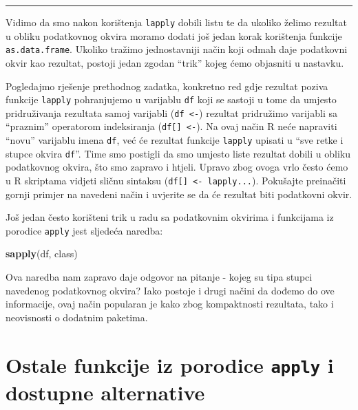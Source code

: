\documentclass[]{book}
\newenvironment{Shaded}{\begin{snugshade}}{\end{snugshade}}
\newcommand{\KeywordTok}[1]{\textcolor[rgb]{0.13,0.29,0.53}{\textbf{#1}}}
\newcommand{\NormalTok}[1]{#1}
\theoremstyle{definition}
\theoremstyle{definition}
\theoremstyle{definition}
\theoremstyle{remark}
\begin{document}
\begin{center}\rule{0.5\linewidth}{\linethickness}\end{center}

Vidimo da smo nakon korištenja \texttt{lapply} dobili listu te da
ukoliko želimo rezultat u obliku podatkovnog okvira moramo dodati još
jedan korak korištenja funkcije \texttt{as.data.frame}. Ukoliko tražimo
jednostavniji način koji odmah daje podatkovni okvir kao rezultat,
postoji jedan zgodan ``trik'' kojeg ćemo objasniti u nastavku.

Pogledajmo rješenje prethodnog zadatka, konkretno red gdje rezultat
poziva funkcije \texttt{lapply} pohranjujemo u varijablu \texttt{df}
koji se sastoji u tome da umjesto pridruživanja rezultata samoj
varijabli (\texttt{df\ \textless{}-}) rezultat pridružimo varijabli sa
``praznim'' operatorom indeksiranja (\texttt{df{[}{]}\ \textless{}-}).
Na ovaj način R neće napraviti ``novu'' varijablu imena \texttt{df}, već
će rezultat funkcije \texttt{lapply} upisati u ``sve retke i stupce
okvira \texttt{df}''. Time smo postigli da smo umjesto liste rezultat
dobili u obliku podatkovnog okvira, što smo zapravo i htjeli. Upravo
zbog ovoga vrlo često ćemo u R skriptama vidjeti sličnu sintaksu
(\texttt{df{[}{]}\ \textless{}-\ lapply...}). Pokušajte preinačiti
gornji primjer na navedeni način i uvjerite se da će rezultat biti
podatkovni okvir.

Još jedan često korišteni trik u radu sa podatkovnim okvirima i
funkcijama iz porodice \texttt{apply} jest sljedeća naredba:

\begin{Shaded}
\begin{Highlighting}[]
\KeywordTok{sapply}\NormalTok{(df, class)   }
\end{Highlighting}
\end{Shaded}

Ova naredba nam zapravo daje odgovor na pitanje - kojeg su tipa stupci
navedenog podatkovnog okvira? Iako postoje i drugi načini da dođemo do
ove informacije, ovaj način popularan je kako zbog kompaktnosti
rezultata, tako i neovisnosti o dodatnim paketima.

\section{\texorpdfstring{Ostale funkcije iz porodice \texttt{apply} i
dostupne
alternative}{Ostale funkcije iz porodice apply i dostupne alternative}}\label{ostale-funkcije-iz-porodice-apply-i-dostupne-alternative}
\end{document}
